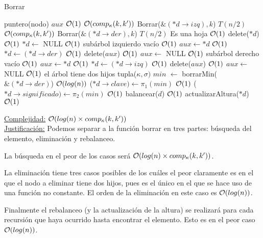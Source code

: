 \begin{Algoritmos}
\begin{algorithm}
\caption{Borrar}
\begin{algorithmic}[1]
	\State puntero(nodo) $aux$
	\Comment $\mathcal{O}(1)$
	\Comment $\mathcal{O}(comp_{\kappa}(k, k'))$
		\State Borrar($\&(*d\to izq), k$)
		\Comment $T(n/2)$
	\Else 
		\Comment $\mathcal{O}(comp_{\kappa}(k, k'))$
			\State Borrar($\&(*d\to der), k$)
			\Comment $T(n/2)$
		\Else 
				\Comment Es una hoja $\mathcal{O}(1)$
				\State delete($*d$)
				\Comment $\mathcal{O}(1)$
				\State $*d\gets$ NULL
				\Comment $\mathcal{O}(1)$
			\Else
					\Comment subárbol izquierdo vacío $\mathcal{O}(1)$
					\State $aux \gets *d$
					\Comment $\mathcal{O}(1)$
					\State $*d\gets (*d\to der)$
					\Comment $\mathcal{O}(1)$
					\State delete($aux$)
					\Comment $\mathcal{O}(1)$
					\State $aux \gets$ NULL
					\Comment $\mathcal{O}(1)$
				\Else
						\Comment subárbol derecho vacío $\mathcal{O}(1)$
						\State $aux \gets *d$
						\Comment $\mathcal{O}(1)$
						\State $*d\gets (*d\to izq)$
						\Comment $\mathcal{O}(1)$
						\State delete($aux$)
						\Comment $\mathcal{O}(1)$
						\State $aux \gets$ NULL
						\Comment $\mathcal{O}(1)$
					\Else
						\Comment el árbol tiene dos hijos
						\State tupla($\kappa, \sigma)$ $min$ $\gets$ borrarMin($\&(*d\to der)$)
						\Comment $\mathcal{O}(log(n))$
						\State($*d\to clave) \gets \pi_1(min)$
						\Comment $\mathcal{O}(1)$
						\State($*d\to significado) \gets \pi_2(min)$
						\Comment $\mathcal{O}(1)$
					\EndIf
				\EndIf
			\EndIf 
		\EndIf
	\EndIf
	\State balancear($d$)
	\Comment $\mathcal{O}(1)$
	\State actualizarAltura($*d$)
	\Comment $\mathcal{O}(1)$
\EndProcedure
\end{algorithmic}
\underline{Complejidad:} $\mathcal{O}(log(n) \times comp_{\kappa}(k, k'))$ \\
\underline{Justificación:} Podemos separar a la función borrar en tres partes: búsqueda del elemento, eliminación y rebalanceo.

La búsqueda en el peor de los casos será $\mathcal{O}(log(n) \times comp_{\kappa}(k, k'))$.

La eliminación tiene tres casos posibles de los cuáles el peor claramente es en el que el nodo a eliminar tiene dos hijos, pues es el único en el que se hace uso de una función no constante. El orden de la eliminación en este caso es $\mathcal{O}(log(n))$.

Finalmente el rebalanceo (y la actualización de la altura) se realizará para cada recursión que haya ocurrido hasta encontrar el elemento. Esto es en el peor caso $\mathcal{O}(log(n))$.


\end{algorithm}
\end{Algoritmos}
